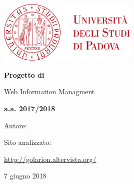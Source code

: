 \begin{titlepage} 
	\centering
	\includegraphics[width=0.50\textwidth]{img/logo.pdf}\par\vspace{1cm} %
	
	{\LARGE\bfseries Progetto di \par Web Information Managment \par}
	\vspace{1cm}
	
	{\Large\bfseries a.a. 2017/2018 \par}
	
	\vspace{1cm} 

	Autore: \par
	{\bfseries \authorName \par} 
	
	\vspace{1cm}


    Sito analizzato: \par
	\url{http://golarion.altervista.org/}

    \vfill
	
	{\large 7 giugno 2018 \par}
	
\end{titlepage}